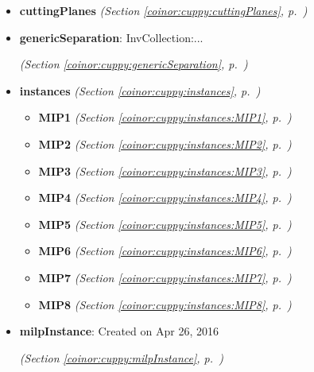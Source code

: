 \begin{itemize}
\setlength{\parskip}{0ex}
\item \textbf{cuttingPlanes}
  \textit{(Section \ref{coinor:cuppy:cuttingPlanes}, p.~\pageref{coinor:cuppy:cuttingPlanes})}

\item \textbf{genericSeparation}: InvCollection:...


  \textit{(Section \ref{coinor:cuppy:genericSeparation}, p.~\pageref{coinor:cuppy:genericSeparation})}

\item \textbf{instances}
  \textit{(Section \ref{coinor:cuppy:instances}, p.~\pageref{coinor:cuppy:instances})}

  \begin{itemize}
\setlength{\parskip}{0ex}
    \item \textbf{MIP1}
  \textit{(Section \ref{coinor:cuppy:instances:MIP1}, p.~\pageref{coinor:cuppy:instances:MIP1})}

    \item \textbf{MIP2}
  \textit{(Section \ref{coinor:cuppy:instances:MIP2}, p.~\pageref{coinor:cuppy:instances:MIP2})}

    \item \textbf{MIP3}
  \textit{(Section \ref{coinor:cuppy:instances:MIP3}, p.~\pageref{coinor:cuppy:instances:MIP3})}

    \item \textbf{MIP4}
  \textit{(Section \ref{coinor:cuppy:instances:MIP4}, p.~\pageref{coinor:cuppy:instances:MIP4})}

    \item \textbf{MIP5}
  \textit{(Section \ref{coinor:cuppy:instances:MIP5}, p.~\pageref{coinor:cuppy:instances:MIP5})}

    \item \textbf{MIP6}
  \textit{(Section \ref{coinor:cuppy:instances:MIP6}, p.~\pageref{coinor:cuppy:instances:MIP6})}

    \item \textbf{MIP7}
  \textit{(Section \ref{coinor:cuppy:instances:MIP7}, p.~\pageref{coinor:cuppy:instances:MIP7})}

    \item \textbf{MIP8}
  \textit{(Section \ref{coinor:cuppy:instances:MIP8}, p.~\pageref{coinor:cuppy:instances:MIP8})}

  \end{itemize}
\item \textbf{milpInstance}: Created on Apr 26, 2016



  \textit{(Section \ref{coinor:cuppy:milpInstance}, p.~\pageref{coinor:cuppy:milpInstance})}

\end{itemize}



